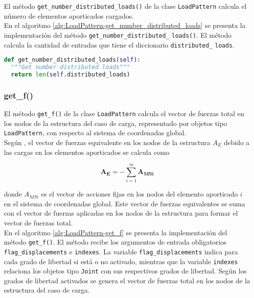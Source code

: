 El método \verb|get_number_distributed_loads()| de la clase \verb|LoadPattern| calcula el número de elementos aporticados cargados.\\

En el algoritmo \ref{alg:LoadPattern-get_number_distributed_loads} se presenta la implementación del método \verb|get_number_distributed_| \verb|loads()|. El método calcula la cantidad de entradas que tiene el diccionario \verb|distributed_| \verb|loads|.\\

\begin{lstlisting}[language=Python,caption=Método \texttt{get\_number\_distributed\_loads()} de la clase \texttt{LoadPattern}.,label=alg:LoadPattern-get_number_distributed_loads, frame=single]
def get_number_distributed_loads(self):
  """Get number distributed loads"""
  return len(self.distributed_loads)
\end{lstlisting}

\subsubsection{get\_f()}

El método \verb|get_f()| de la clase \verb|LoadPattern| calcula el vector de fuerzas total en los nodos de la estructura del caso de carga, representado por objetos tipo \verb|LoadPattern|, con respecto al sistema de coordenadas global.\\

Según \cite{weaver1990matrixanalysis}, el vector de fuerzas equivalente en los nodos de la estructura $ A_E $ debido a las cargas en los elementos aporticados se calcula como

\begin{equation}
  \mathbf{A_E} = - \sum_{i=1}^m \mathbf{A_{MSi}}
\end{equation}

donde $ A_{MSi} $ es el vector de acciones fijas en los nodos del elemento aporticado $ i $ en el sistema de coordenadas global. Este vector de fuerzas equivalentes se suma con el vector de fuerzas aplicadas en los nodos de la estructura para formar el vector de fuerzas total.\\

En el algoritmo \ref{alg:LoadPattern-get_f} se presenta la implementación del método \verb|get_f()|. El método recibe los argumentos de entrada obligatorios \verb|flag_displacements| e \verb|indexes|. La variable \verb|flag_displacements| indica para cada grado de libertad si está o no activado, mientras que la variable \verb|indexes| relaciona los objetos tipo \verb|Joint| con sus respectivos grados de libertad. Según los grados de libertad activados se genera el vector de fuerzas total en los nodos de la estructura del caso de carga.\\

